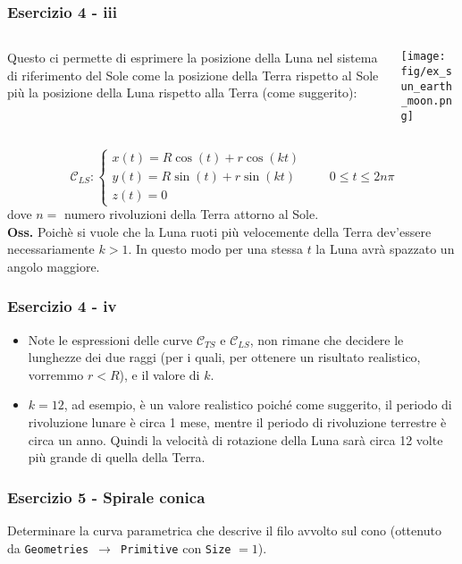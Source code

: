 \documentclass{beamer}
\newcommand{\fig}{figures} %
\begin{document}
\begin{frame}
\frametitle{Esercizio 4 - iii}

\begin{columns}
\begin{column}{0.5\textwidth}
Questo ci permette di esprimere la posizione della Luna nel sistema di riferimento del Sole come la posizione della Terra rispetto al Sole  pi\`u la posizione della Luna rispetto alla Terra (come suggerito):
\end{column}
\begin{column}{0.5\textwidth}
\texttt{[image: \\fig/ex\_sun\_earth\_moon.png]}
\end{column}
\end{columns}
\vspace{0.4cm}
\begin{displaymath}
\mathcal{C}_{LS}:\begin{cases}
 x(t)=  R \cos(t) + r \cos(kt)\\
 y(t)=  R \sin(t) + r \sin(kt)\\
 z(t)= 0
\end{cases}
\qquad 0 \leq t \leq 2 n \pi
\end{displaymath}
dove $n =$ numero rivoluzioni della Terra attorno al Sole. \\
\vspace{0.2cm}
\textbf{Oss.} Poichè si vuole che la Luna ruoti più velocemente della Terra dev'essere necessariamente $k > 1$. In questo modo per una stessa $t$ la Luna avr\`a spazzato un angolo maggiore.
\end{frame}


\begin{frame}
	\frametitle{Esercizio 4 - iv} 
	\begin{itemize}
	\item Note le espressioni delle curve $\mathcal{C}_{TS}$ e $\mathcal{C}_{LS}$, non rimane che
	decidere le lunghezze dei due raggi (per i quali, per ottenere un risultato
	realistico, vorremmo $r<R$), e il valore di $k$.  
	\item $k = 12$, ad esempio, \`e un valore realistico poich\'e come suggerito, il periodo di rivoluzione lunare \`e circa 1 mese, mentre il periodo di rivoluzione terrestre \`e circa un anno. Quindi la velocit\`a di rotazione della Luna sar\`a circa 12 volte pi\`u grande di quella della Terra.
	\end{itemize}
\end{frame}


\begin{frame}
	\frametitle{Esercizio 5 - Spirale conica}
	
	\begin{center}
	\end{center}
	Determinare la curva parametrica che descrive il filo avvolto sul cono (ottenuto da \texttt{Geometries $\rightarrow$ Primitive} con \texttt{Size} $=1$). 
\end{frame}
\end{document}
